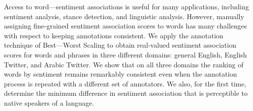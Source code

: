 Access to word---sentiment associations is useful for many applications, including sentiment analysis, stance detection, and linguistic analysis. However, manually assigning fine-grained sentiment association scores to words has many challenges with respect to keeping annotations consistent. We apply the annotation technique of Best---Worst Scaling to obtain real-valued sentiment association scores for words and phrases in three different domains: general English, English Twitter, and Arabic Twitter. We show that on all three domains the ranking of words by sentiment remains remarkably consistent even when the annotation process is repeated with a different set of annotators. We also, for the first time, determine the minimum difference in sentiment association that is perceptible to native speakers of a language.
